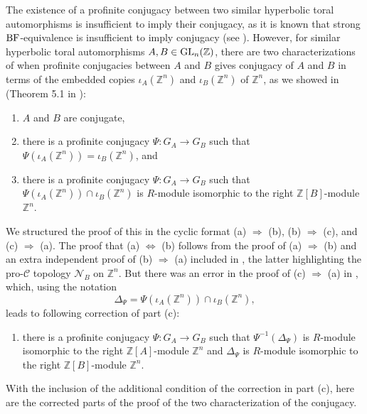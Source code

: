 \documentclass{amsart}
\theoremstyle{plain}
\theoremstyle{definition}
\theoremstyle{remark}
\begin{document}
The existence of a profinite conjugacy between two similar hyperbolic toral automorphisms is insufficient to imply their conjugacy, as it is known that strong ${\rm BF}$-equivalence is insufficient to imply conjugacy (see \cite{BM19, MR05}). However, for similar hyperbolic toral automorphisms $A,B\in {\rm GL}_n({\mathbb Z})$, there are two characterizations of when profinite conjugacies between $A$ and $B$ gives conjugacy of $A$ and $B$ in terms of the embedded copies $\iota_A({\mathbb Z}^n)$ and $\iota_B({\mathbb Z}^n)$ of ${\mathbb Z}^n$, as we showed in (Theorem 5.1 in \cite{BM12}):
\begin{enumerate}
\item[(a)] $A$ and $B$ are conjugate, 
\item[(b)] there is a profinite conjugacy $\Psi:G_A\to G_B$ such that $\Psi(\iota_A({\mathbb Z}^n)) = \iota_B({\mathbb Z}^n)$, and 
\item[(c)] there is a profinite conjugacy $\Psi:G_A\to G_B$ such that $\Psi(\iota_A({\mathbb Z}^n))\cap \iota_B({\mathbb Z}^n)$ is $R$-module isomorphic to the right ${\mathbb Z}[B]$-module ${\mathbb Z}^n$.
\end{enumerate}
We structured the proof of this in the cyclic format (a) $\Rightarrow$ (b), (b) $\Rightarrow$ (c), and (c) $\Rightarrow$ (a). The proof that (a) $\Leftrightarrow$ (b) follows from the proof of (a) $\Rightarrow$ (b)  and an extra independent proof of (b) $\Rightarrow$ (a) included in \cite{BM12}, the latter highlighting the pro-${\mathcal C}$ topology ${\mathcal N}_B$ on ${\mathbb Z}^n$. But there was an error in the proof of (c) $\Rightarrow$ (a) in \cite{BM12}, which, using the notation
\[ \Delta_\Psi = \Psi( \iota_A({\mathbb Z}^n)) \cap \iota_B({\mathbb Z}^n),\]
leads to following correction of part (c):
\begin{enumerate}
\item[(c)] there is a profinite conjugacy $\Psi:G_A\to G_B$ such that $\Psi^{-1}( \Delta_\Psi)$ is $R$-module isomorphic to the right ${\mathbb Z}[A]$-module ${\mathbb Z}^n$ and $\Delta_\Psi$ is $R$-module isomorphic to the right ${\mathbb Z}[B]$-module ${\mathbb Z}^n$.
\end{enumerate}
With the inclusion of the additional condition of the correction in part (c), here are the corrected parts of the proof of the two characterization of the conjugacy.
\end{document}
